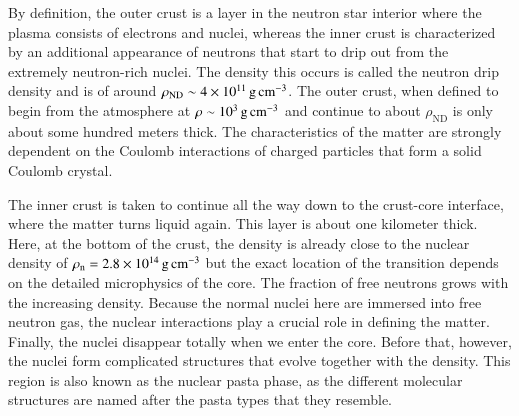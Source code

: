 By definition, the outer crust is a layer in the neutron star interior where the plasma consists of electrons and nuclei, whereas the inner crust is characterized by an additional appearance of neutrons that start to drip out from the extremely neutron-rich nuclei.
The density this occurs is called the neutron drip density and is of around $\rho_{\mathrm{ND}} \sim 4 \times 10^{11} \, \mathrm{g}\,\mathrm{cm}^{-3}$.
The outer crust, when defined to begin from the atmosphere at $\rho \sim 10^3 \, \mathrm{g}\,\mathrm{cm}^{-3}$ and continue to about $\rho_{\mathrm{ND}}$ is only about some hundred meters thick.
The characteristics of the matter are strongly dependent on the Coulomb interactions of charged particles that form a solid Coulomb crystal.

%

The inner crust is taken to continue all the way down to the crust-core interface, where the matter turns liquid again.
This layer is about one kilometer thick.
Here, at the bottom of the crust, the density is already close to the nuclear density of $\rho_{\mathrm{n}} = 2.8 \times 10^{14} \, \mathrm{g}\,\mathrm{cm}^{-3}$ but the exact location of the transition depends on the detailed microphysics of the core.
The fraction of free neutrons grows with the increasing density.
Because the normal nuclei here are immersed into free neutron gas, the nuclear interactions play a crucial role in defining the matter.
Finally, the nuclei disappear totally when we enter the core.
Before that, however, the nuclei form complicated structures that evolve together with the density.
This region is also known as the nuclear pasta phase, as the different molecular structures are named after the pasta types that they resemble.\cite[see e.g.][]{CH16}


